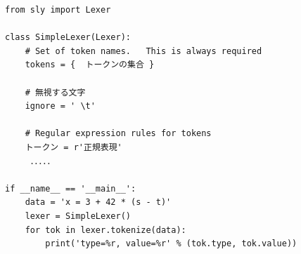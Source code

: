 \documentclass{jarticle}
\begin{document}
\begin{Verbatim}[frame=single]
from sly import Lexer

class SimpleLexer(Lexer):
    # Set of token names.   This is always required
    tokens = {  トークンの集合 }

    # 無視する文字
    ignore = ' \t'

    # Regular expression rules for tokens
    トークン = r'正規表現'
　　　．．．．．

if __name__ == '__main__':
    data = 'x = 3 + 42 * (s - t)'
    lexer = SimpleLexer()
    for tok in lexer.tokenize(data):
        print('type=%r, value=%r' % (tok.type, tok.value))

\end{Verbatim}
\end{document}
